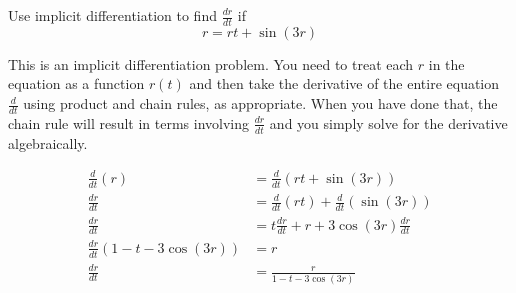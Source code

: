 \documentclass{ximera}
\author{Emma Smith Zbarsky}
\begin{document}
\begin{exercise}

Use implicit differentiation to find $\frac{dr}{dt}$ if
\[r = rt+\sin(3r)\]


\begin{hint}
This is an implicit differentiation problem. You need to treat each $r$
in the equation as a function $r(t)$ and then take the derivative of the
entire equation $\frac{d}{dt}$ using product and chain rules, as
appropriate. When you have done that, the chain rule will result in
terms involving $\frac{dr}{dt}$ and you simply solve for the derivative
algebraically.
\end{hint}


\begin{hint}
\begin{align*}
\frac{d}{dt}\left(r\right) &= \frac{d}{dt}\left(rt+\sin(3r)\right) \\
\frac{dr}{dt} &= \frac{d}{dt}\left(rt\right)+\frac{d}{dt}\left(\sin(3r)\right) \\
\frac{dr}{dt} &= t\frac{dr}{dt}+r + 3\cos(3r)\frac{dr}{dt} \\
\frac{dr}{dt}\left(1-t-3\cos(3r)\right) &= r \\
\frac{dr}{dt} &= \frac{r}{1-t-3\cos(3r)} 
\end{align*}
\end{hint}


\begin{multipleChoice}
\end{multipleChoice}

\end{exercise}
\end{document}
